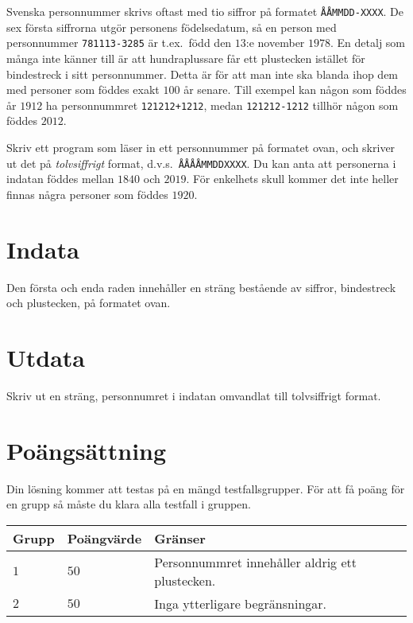 
Svenska personnummer skrivs oftast med tio siffror på formatet \texttt{ÅÅMMDD-XXXX}. De sex första siffrorna utgör personens födelsedatum, så en
person med personnummer \texttt{781113-3285} är t.ex.\ född den $13$:e november $1978$. En detalj som många
inte känner till är att hundraplussare får ett plustecken istället för bindestreck i sitt 
personnummer. Detta är för att man inte ska blanda ihop dem med personer som föddes exakt $100$
år senare. Till exempel kan någon som föddes år $1912$ ha personnummret \texttt{121212+1212}, medan 
\texttt{121212-1212} tillhör någon som föddes $2012$. 

Skriv ett program som läser in ett personnummer på formatet ovan,
och skriver ut det på \emph{tolvsiffrigt} format, d.v.s.\ \texttt{ÅÅÅÅMMDDXXXX}.
Du kan anta att personerna i indatan föddes mellan $1840$ och $2019$.
För enkelhets skull kommer det inte heller finnas några personer som föddes $1920$. 

\section*{Indata}
Den första och enda raden innehåller en sträng bestående av siffror, bindestreck och plustecken, på formatet ovan.

\section*{Utdata}
Skriv ut en sträng, personnumret i indatan omvandlat till tolvsiffrigt format.

\section*{Poängsättning}
Din lösning kommer att testas på en mängd testfallsgrupper.
För att få poäng för en grupp så måste du klara alla testfall i gruppen.

\noindent
\begin{tabular}{| l | l | l |}
  \hline
  \textbf{Grupp} & \textbf{Poängvärde} & \textbf{Gränser} \\ \hline
  $1$   & $50$       & Personnummret innehåller aldrig ett plustecken. \\ \hline
  $2$   & $50$       & Inga ytterligare begränsningar. \\ \hline
\end{tabular}
